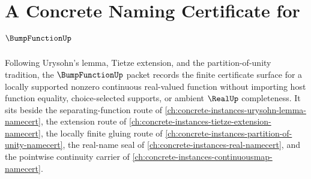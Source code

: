 \chapter{A Concrete Naming Certificate for $\BumpFunctionUp$}
\label{ch:concrete-instances-bump-function-namecert}

Following Urysohn's lemma, Tietze extension, and the partition-of-unity tradition, the $\BumpFunctionUp$ packet records the finite certificate surface for a locally supported nonzero continuous real-valued function without importing host function equality, choice-selected supports, or ambient $\RealUp$ completeness. It sits beside the separating-function route of \autoref{ch:concrete-instances-urysohn-lemma-namecert}, the extension route of \autoref{ch:concrete-instances-tietze-extension-namecert}, the locally finite gluing route of \autoref{ch:concrete-instances-partition-of-unity-namecert}, the real-name seal of \autoref{ch:concrete-instances-real-namecert}, and the pointwise continuity carrier of \autoref{ch:concrete-instances-continuousmap-namecert}.

